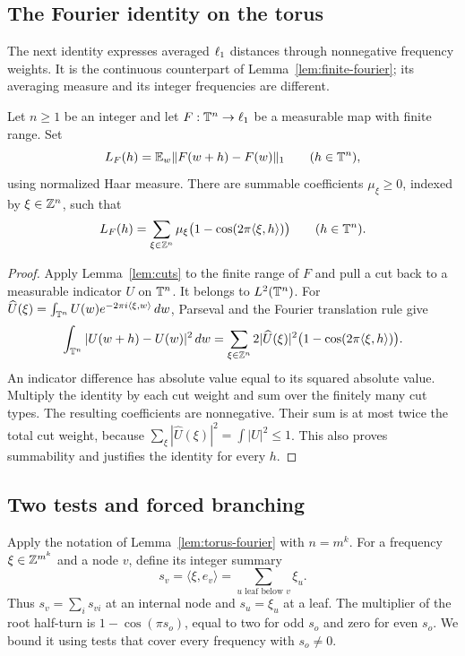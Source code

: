 \subsection{The Fourier identity on the torus}

The next identity expresses averaged $\ell_1$ distances through
nonnegative frequency weights. It is the continuous counterpart of
Lemma~\ref{lem:finite-fourier}; its averaging measure and its integer
frequencies are different.

\begin{lemma}\label{lem:torus-fourier}
Let $n\geq1$ be an integer and let $F:\mathbb T^n\to\ell_1$ be a measurable
map with finite range. Set
\[
 L_F(h)=\mathbb E_w\|F(w+h)-F(w)\|_1
 \qquad(h\in\mathbb T^n),
\]
using normalized Haar measure. There are summable coefficients
$\mu_\xi\geq0$, indexed by $\xi\in\mathbb Z^n$, such that
\begin{equation}\label{eq:torus-fourier}
 L_F(h)=\sum_{\xi\in\mathbb Z^n}
 \mu_\xi\bigl(1-\cos(2\pi\langle\xi,h\rangle)\bigr)
 \qquad(h\in\mathbb T^n).
\end{equation}
\end{lemma}
\begin{proof}
Apply Lemma~\ref{lem:cuts} to the finite range of $F$ and pull a cut
back to a measurable indicator $U$ on $\mathbb T^n$. It belongs to
$L^2(\mathbb T^n)$. For
$\widehat U(\xi)=\int_{\mathbb T^n}U(w)e^{-2\pi i\langle\xi,w\rangle}\,dw$,
Parseval and the Fourier translation rule give
\[
 \int_{\mathbb T^n}|U(w+h)-U(w)|^2\,dw
 =\sum_{\xi\in\mathbb Z^n}2|\widehat U(\xi)|^2
 \bigl(1-\cos(2\pi\langle\xi,h\rangle)\bigr).
\]
An indicator difference has absolute value equal to its squared
absolute value. Multiply the identity by each cut weight and sum over
the finitely many cut types. The resulting coefficients are nonnegative.
Their sum is at most twice the total cut weight, because
$\sum_\xi|\widehat U(\xi)|^2=\int|U|^2\leq1$. This also proves
summability and justifies the identity for every $h$.
\end{proof}

\subsection{Two tests and forced branching}

Apply the notation of Lemma~\ref{lem:torus-fourier} with $n=m^k$.
For a frequency $\xi\in\mathbb Z^{m^k}$ and a node $v$, define its integer
summary
\[
 s_v=\langle\xi,e_v\rangle
 =\sum_{u\text{ leaf below }v}\xi_u.
\]
Thus $s_v=\sum_i s_{vi}$ at an internal node and $s_u=\xi_u$ at a
leaf. The multiplier of the root half-turn is $1-\cos(\pi s_o)$,
equal to two for odd $s_o$ and zero for even $s_o$. We bound it using
tests that cover every frequency with $s_o\ne0$.

